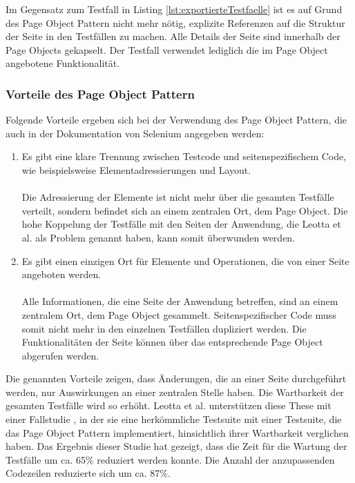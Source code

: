 Im Gegensatz zum Testfall in Listing \ref{lst:exportierteTestfaelle} ist es auf Grund des Page Object Pattern nicht mehr nötig, explizite Referenzen auf die Struktur der Seite in den Testfällen zu machen. Alle Details der Seite sind innerhalb der Page Objects gekapselt. Der Testfall verwendet lediglich die im Page Object angebotene Funktionalität.


\subsubsection{Vorteile des Page Object Pattern}
\label{sec:vorteile_des_page_object_pattern}

Folgende Vorteile ergeben sich bei der Verwendung des Page Object Pattern, die auch in der Dokumentation von Selenium \cite{selenium_selenium_2015-2} angegeben werden:

\begin{enumerate}
\item Es gibt eine klare Trennung zwischen Testcode und seitenspezifischem Code, wie beispielsweise Elementadressierungen und Layout. \\ \\
Die Adressierung der Elemente ist nicht mehr über die gesamten Testfälle verteilt, sondern befindet sich an einem zentralen Ort, dem Page Object.
Die hohe Koppelung der Testfälle mit den Seiten der Anwendung, die Leotta et al. \cite{leotta_repairing_2013} als Problem genannt haben, kann somit überwunden werden.

\item Es gibt einen einzigen Ort für Elemente und Operationen, die von einer Seite angeboten werden. \\ \\
Alle Informationen, die eine Seite der Anwendung betreffen, sind an einem zentralem Ort, dem Page Object gesammelt. Seitenspezifischer Code muss somit nicht mehr in den einzelnen Testfällen dupliziert werden. Die Funktionalitäten der Seite können über das entsprechende Page Object abgerufen werden.

\end{enumerate}

Die genannten Vorteile zeigen, dass Änderungen, die an einer Seite durchgeführt werden, nur Auswirkungen an einer zentralen Stelle haben. Die Wartbarkeit der gesamten Testfälle wird so erhöht.
Leotta et al. unterstützen diese These mit einer Fallstudie \cite{leotta_repairing_2013}, in der sie eine herkömmliche Testsuite mit einer Testsuite, die das Page Object Pattern implementiert, hinsichtlich ihrer Wartbarkeit verglichen haben.
Das Ergebnis dieser Studie hat gezeigt, dass die Zeit für die Wartung der Testfälle um ca. 65\% reduziert werden konnte. Die Anzahl der anzupassenden Codezeilen reduzierte sich um ca. 87\%.


